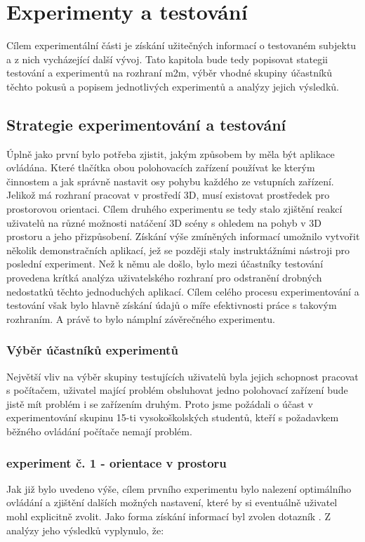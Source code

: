 
\section{Experimenty a testování}
Cílem experimentální části je získání užitečných informací o testovaném subjektu a z nich vycházející další vývoj. Tato kapitola bude tedy popisovat stategii testování a experimentů na rozhraní m2m, výběr vhodné skupiny účastníků těchto pokusů a popisem jednotlivých experimentů a analýzy jejich výsledků.

\subsection{Strategie experimentování a testování}
Úplně jako první bylo potřeba zjistit, jakým způsobem by měla být aplikace ovládána. Které tlačítka obou polohovacích zařízení používat ke kterým činnostem a jak správně nastavit osy pohybu každého ze vstupních zařízení. Jelikož má rozhraní pracovat v prostředí 3D, musí existovat prostředek pro prostorovou orientaci. Cílem druhého experimentu se tedy stalo zjištění reakcí uživatelů na různé možnosti natáčení 3D scény s ohledem na pohyb v 3D prostoru a jeho přizpůsobení. Získání výše zmíněných informací umožnilo vytvořit několik demonstračních aplikací, jež se později staly instruktážními nástroji pro poslední experiment. Než k němu ale došlo, bylo mezi účastníky testování provedena krítká analýza uživatelského rozhraní pro odstranění drobných nedostatků těchto jednoduchých aplikací. Cílem celého procesu experimentování a testování však bylo hlavně získání údajů o míře efektivnosti práce s takovým rozhraním. A právě to bylo námplní závěrečného experimentu. 

\subsubsection{Výběr účastníků experimentů}
Největší vliv na výběr skupiny testujících uživatelů byla jejich schopnost pracovat s počítačem, uživatel mající problém obsluhovat jedno polohovací zařízení bude jistě mít problém i se zařízením druhým. Proto jsme požádali o účast v experimentování skupinu 15-ti vysokoškolských studentů, kteří s požadavkem běžného ovládání počítače nemají problém.

\subsubsection{experiment č. 1 - orientace v prostoru}
Jak již bylo uvedeno výše, cílem prvního experimentu bylo nalezení optimálního ovládání a zjištění dalších možných nastavení, které by si eventuálně uživatel mohl explicitně zvolit. Jako forma získání informací byl zvolen dotazník %
. Z analýzy jeho výsledků vyplynulo, že: %

